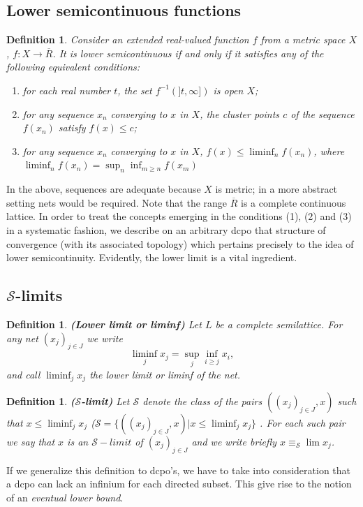 \documentclass[a4paper,12pt]{article}
\newtheorem{definition}[theorem]{Definition}
\begin{document}
\subsection{Lower semicontinuous functions}
\begin{definition}\label{semicontinuous}
Consider an extended real-valued function $f$ from a metric space $X$, $f: X \rightarrow \overline{R}$. It is \emph{lower semicontinuous} if and only if it satisfies any of the following equivalent conditions:
\begin{enumerate}
  \item for each real number $t$, the set $f^{-1}(]t, \infty])$ is open $X$;
  \item for any sequence $x_n$ converging to $x$ in $X$, the cluster points $c$ of the sequence $f(x_n)$ satisfy $f(x) \leq c$;
  \item for any sequence $x_n$ converging to $x$ in $X$, $f(x) \leq \liminf_n f(x_n)$, where $\liminf_n f(x_n) = \sup_n\inf_{m \geq n} f(x_m)$
\end{enumerate}

\end{definition}
In the above, sequences are adequate because $X$ is metric; in a more abstract setting nets would be required. Note that the range $\overline{R}$ is a complete continuous lattice. In order to treat the concepts emerging in the conditions (1), (2) and (3) in a systematic fashion, we describe on an arbitrary dcpo that structure of convergence (with its associated topology) which pertains precisely to the idea of lower semicontinuity. Evidently, the lower limit is a vital ingredient.

\subsection{$\mathcal{S}$-limits}

\begin{definition} \textbf{(Lower limit or liminf)} Let $L$ be a complete semilattice. For any net $(x_j)_{j\in J}$ we write
$$\liminf_j x_j = \sup_j \inf_{i \geq j} x_i,$$
and call $\liminf_j x_j$ the \emph{lower limit} or \emph{liminf} of the net.
\end{definition}

\begin{definition} \textbf{($\mathcal{S}$-limit)} Let $\mathcal{S}$ denote the class of the pairs $((x_j)_{j\in J}, x)$ such that $x \leq \liminf_j x_j$ ($\mathcal{S} = \{((x_j)_{j\in J}, x) | x \leq \liminf_j x_j \}$ . For each such pair we say that $x$ is an $\mathcal{S}-limit$ of $(x_j)_{j \in J}$ and we write briefly $x \equiv_{\mathcal{S}} \lim x_j$.
\end{definition}
If we generalize this definition to dcpo's, we have to take into consideration that a dcpo can lack an infinium for each directed subset. This give rise to the notion of an \emph{eventual lower bound}.
\end{document}
